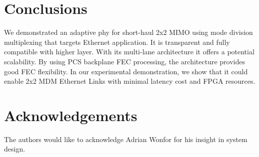 


\section{Conclusions}

We demonstrated an adaptive \ac{phy} for short-haul 2x2 MIMO using mode division multiplexing that targets Ethernet application. It is transparent and fully compatible with higher layer. With its multi-lane architecture it offers a potential scalability. By using PCS backplane FEC processing, the architecture provides good FEC flexibility. In our experimental demonstration, we show that it could enable 2x2 MDM Ethernet Links with minimal latency cost and FPGA resources.

 


\section{Acknowledgements}
The authors would like to acknowledge Adrian Wonfor for his insight in system design.






%



